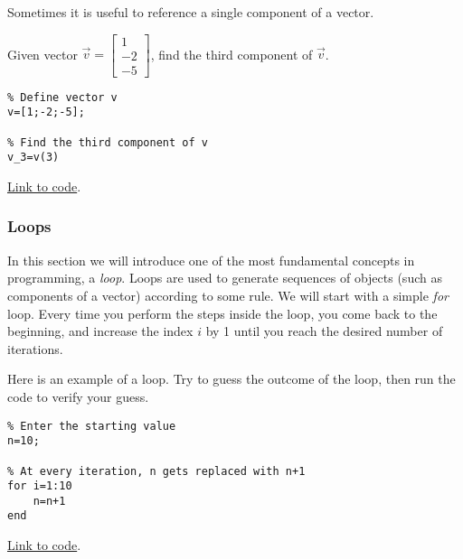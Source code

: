 \documentclass{ximera}
\begin{document}
Sometimes it is useful to reference a single component of a vector.

\begin{example}\label{ex_oct_vec_component}
    Given vector $\vec{v}=\begin{bmatrix}1\\-2\\-5\end{bmatrix}$, find the third component of $\vec{v}$.

\begin{explanation}    
\begin{verbatim}
% Define vector v
v=[1;-2;-5];

% Find the third component of v
v_3=v(3)
\end{verbatim}

    \href{https://sagecell.sagemath.org/?z=eJxTVXBJTcvMS1UoS00uyS9SKOPlKrONNrTWNbLWNY215uXi5VJVcMvMS1EoyUgF4syiFIXk_NyC_LzUvBKF_DSwhnhj2zINY00AVTYWYw==&lang=octave&interacts=eJyLjgUAARUAuQ==}{Link to code}.
\end{explanation}    
\end{example}

\subsubsection*{Loops}
In this section we will introduce one of the most fundamental concepts in programming, a \emph{loop}.  Loops are used to generate sequences of objects (such as components of a vector) according to some rule.  We will start with a simple \emph{for} loop.  Every time you perform the steps inside the loop, you come back to the beginning, and increase the index $i$ by 1 until you reach the desired number of iterations.  

\begin{example}\label{ex:loop1}
Here is an example of a loop.  Try to guess the outcome of the loop, then run the code to verify your guess.

        \begin{verbatim}
% Enter the starting value
n=10;

% At every iteration, n gets replaced with n+1
for i=1:10
    n=n+1
end
    \end{verbatim}

\href{https://sagecell.sagemath.org/?z=eJwdyjEOglAQRdF-ktnDa6iw4LeSX1i4kB95wiRkMMOIcfcSb3lyO9w9GciF2LNFms842vqmitcyjCoqHW4JHowv7Jxb2uYXOGbmjuBrbQ9O-Fgu8L6oPLeA1XItgwrOvP6ZPv0AoF8hKw==&lang=octave&interacts=eJyLjgUAARUAuQ==}{Link to code}.    
\end{example}
\end{document}
